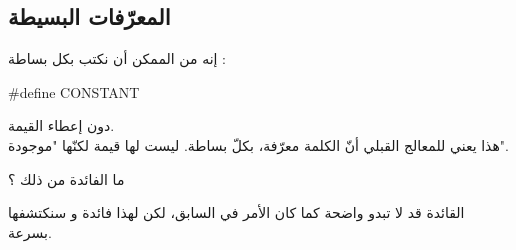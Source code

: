 \subsection{المعرّفات البسيطة}
إنه من الممكن أن نكتب بكل بساطة :
\begin{Csource}
#define CONSTANT
\end{Csource}
دون إعطاء القيمة.\\
هذا يعني للمعالج القبلي أنّ الكلمة
معرّفة، بكلّ بساطة. ليست لها قيمة لكنّها "موجودة".
\begin{question}
  ما الفائدة من ذلك ؟
\end{question}
القائدة قد لا تبدو واضحة كما كان الأمر في السابق، لكن لهذا فائدة و سنكتشفها بسرعة.
